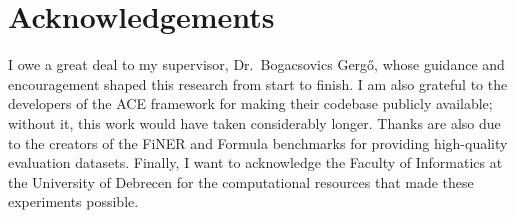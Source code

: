 \documentclass[12pt,a4paper,oneside]{article}
\begin{document}
\newpage
\section*{Acknowledgements}

I owe a great deal to my supervisor, Dr.~Bogacsovics Gerg\H{o}, whose guidance and encouragement shaped this research from start to finish. I am also grateful to the developers of the ACE framework \citep{ace2025} for making their codebase publicly available; without it, this work would have taken considerably longer. Thanks are also due to the creators of the FiNER \citep{loukas2022finer} and Formula \citep{wang2025finlora} benchmarks for providing high-quality evaluation datasets. Finally, I want to acknowledge the Faculty of Informatics at the University of Debrecen for the computational resources that made these experiments possible.

\newpage
{}
\end{document}
